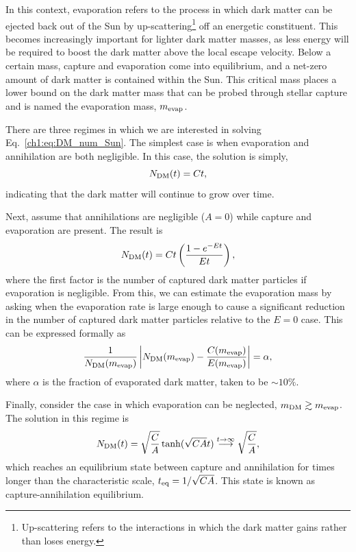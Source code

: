 In this context, evaporation refers to the process in which dark matter can be ejected back out of the Sun by up-scattering\footnote{Up-scattering refers to the interactions in which the dark matter gains rather than loses energy. } off an energetic constituent. This becomes increasingly important for lighter dark matter masses, as less energy will be required to boost the dark matter above the local escape velocity. Below a certain mass, capture and evaporation come into equilibrium, and a net-zero amount of dark matter is contained within the Sun.
This critical mass places a lower bound on the dark matter mass that can be probed through stellar capture and is named the evaporation mass, $m_\mathrm{evap}$. 

There are three regimes in which we are interested in solving Eq.~\ref{ch1:eq:DM_num_Sun}. The simplest case is when evaporation and annihilation are both negligible. In this case, the solution is simply, 
\begin{equation}
    N_\mathrm{DM}(t) = C t,
\end{equation}
indicating that the dark matter will continue to grow over time.

Next,  assume that annihilations are negligible ($A = 0$) while capture and evaporation are present. The result is
\begin{equation}
    N_\mathrm{DM}(t) = Ct\left(\frac{1 - e^{-E t}}{E t}\right),  
\end{equation}
where the first factor is the number of captured dark matter particles if evaporation is negligible. From this, we can estimate the evaporation mass by asking when the evaporation rate is large enough to cause a significant reduction in the number of captured dark matter particles relative to the $E=0$ case. This can be expressed formally as~\cite{Garani:2017jcj_may_DarkmatterSun}
\begin{equation}
    \frac{1}{N_\mathrm{DM}(m_\mathrm{evap})}\left| N_\mathrm{DM}(m_\mathrm{evap}) - \frac{C(m_\mathrm{evap})}{E(m_\mathrm{evap})} \right| = \alpha,
\end{equation} 
where $\alpha$ is the fraction of evaporated dark matter, taken to be $\sim 10\%$. 

Finally, consider the case in which evaporation can be neglected, $m_\mathrm{DM}\gtrsim m_\mathrm{evap}$. The solution in this regime is
\begin{equation}
    N_\mathrm{DM}(t) = \sqrt{\frac{C}{A}}\tanh(\sqrt{CA}t)\overset{t\rightarrow\infty}{\longrightarrow} \sqrt{\frac{C}{A}},
\end{equation}
which reaches an equilibrium state between capture and annihilation for times longer than the characteristic scale, $t_{\rm eq} = 1/\sqrt{CA}$. This state is known as capture-annihilation equilibrium.

